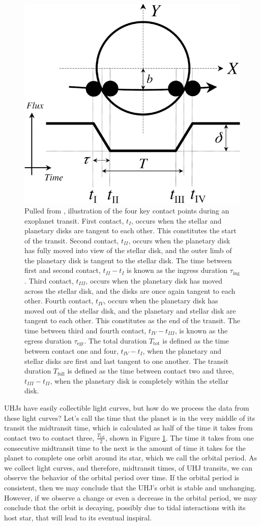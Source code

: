 \documentclass[oneside,12pt]{amsart}
\numberwithin{page}{section}
\begin{document}
\begin{figure}[htbp]
    \centering
    \includegraphics[width=0.5\linewidth]{figs/winn_fig2.png}
    \caption{Pulled from \citet{winn2010transits}, illustration of the four key contact points during an exoplanet transit. First contact, $t_I$, occurs when the stellar and planetary disks are tangent to each other. This constitutes the start of the transit. Second contact, $t_{II}$, occurs when the planetary disk has fully moved into view of the stellar disk, and the outer limb of the planetary disk is tangent to the stellar disk. The time between first and second contact, $t_{II} - t_I$ is known as the ingress duration $\tau_\text{ing}$. Third contact, $t_{III}$, occurs when the planetary disk has moved across the stellar disk, and the disks are once again tangent to each other. Fourth contact, $t_{IV}$, occurs when the planetary disk has moved out of the stellar disk, and the planetary and stellar disk are tangent to each other. This constitutes as the end of the transit. The time between third and fourth contact, $t_{IV} - t_{III}$, is known as the egress duration $\tau_\text{egr}$. The total duration $T_\text{tot}$ is defined as the time between contact one and four, $t_{IV} - t_{I}$, when the planetary and stellar disks are first and last tangent to one another. The transit duration $T_\text{full}$ is defined as the time between contact two and three, $t_{III} - t_{II}$, when the planetary disk is completely within the stellar disk.}
    \label{fig:winnfig2}
\end{figure}

UHJs have easily collectible light curves, but how do we process the data from these light curves? Let's call the time that the planet is in the very middle of its transit the midtransit time, which is calculated as half of the time it takes from contact two to contact three, $\frac{T_{\text{tot}}}{2}$, shown in Figure \ref{fig:winnfig2}. The time it takes from one consecutive midtransit time to the next is the amount of time it takes for the planet to complete one orbit around its star, which we call the orbital period. As we collect light curves, and therefore, midtransit times, of UHJ transits, we can observe the behavior of the orbital period over time. If the orbital period is consistent, then we may conclude that the UHJ's orbit is stable and unchanging. However, if we observe a change or even a decrease in the orbital period, we may conclude that the orbit is decaying, possibly due to tidal interactions with its host star, that will lead to its eventual inspiral. 
\end{document}
